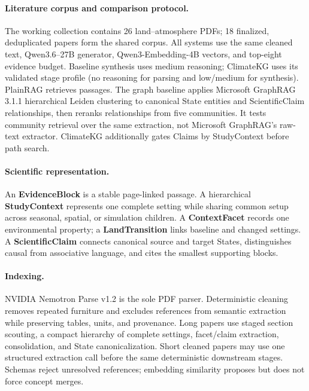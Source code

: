 \documentclass{article}
\newcommand{\system}{ClimateKG}
\begin{document}
\paragraph{Literature corpus and comparison protocol.}
The working collection contains 26 land--atmosphere PDFs; 18 finalized, deduplicated papers form the shared corpus. All systems use the same cleaned text, Qwen3.6--27B generator, Qwen3-Embedding-4B vectors, and top-eight evidence budget. Baseline synthesis uses medium reasoning; \system{} uses its validated stage profile (no reasoning for parsing and low/medium for synthesis). PlainRAG retrieves passages. The graph baseline applies Microsoft GraphRAG 3.1.1 hierarchical Leiden clustering to canonical State entities and ScientificClaim relationships, then reranks relationships from five communities. It tests community retrieval over the same extraction, not Microsoft GraphRAG's raw-text extractor. \system{} additionally gates Claims by StudyContext before path search.
\paragraph{Scientific representation.}
An \textbf{EvidenceBlock} is a stable page-linked passage. A hierarchical \textbf{StudyContext} represents one complete setting while sharing common setup across seasonal, spatial, or simulation children. A \textbf{ContextFacet} records one environmental property; a \textbf{LandTransition} links baseline and changed settings. A \textbf{ScientificClaim} connects canonical source and target States, distinguishes causal from associative language, and cites the smallest supporting blocks.

\paragraph{Indexing.}
NVIDIA Nemotron Parse v1.2 is the sole PDF parser. Deterministic cleaning removes repeated furniture and excludes references from semantic extraction while preserving tables, units, and provenance. Long papers use staged section scouting, a compact hierarchy of complete settings, facet/claim extraction, consolidation, and State canonicalization. Short cleaned papers may use one structured extraction call before the same deterministic downstream stages. Schemas reject unresolved references; embedding similarity proposes but does not force concept merges.
\end{document}
